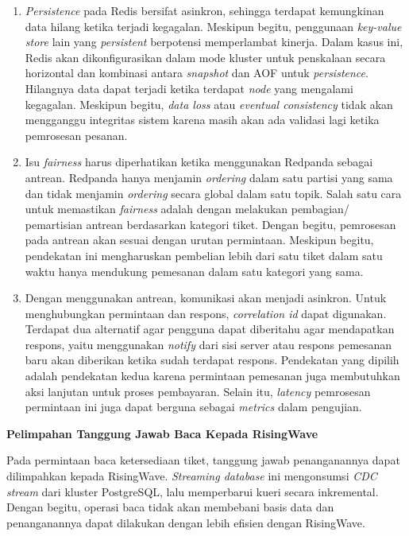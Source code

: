 \begin{enumerate}
    \item \textit{Persistence} pada Redis bersifat asinkron, sehingga terdapat kemungkinan data hilang ketika terjadi kegagalan. Meskipun begitu, penggunaan \textit{key-value store} lain yang \textit{persistent} berpotensi memperlambat kinerja. Dalam kasus ini, Redis akan dikonfigurasikan dalam mode kluster untuk penskalaan secara horizontal dan kombinasi antara \textit{snapshot} dan AOF untuk \textit{persistence}. Hilangnya data dapat terjadi ketika terdapat \textit{node} yang mengalami kegagalan. Meskipun begitu, \textit{data loss} atau \textit{eventual consistency} tidak akan mengganggu integritas sistem karena masih akan ada validasi lagi ketika pemrosesan pesanan.
    \item Isu \textit{fairness} harus diperhatikan ketika menggunakan Redpanda sebagai antrean. Redpanda hanya menjamin \textit{ordering} dalam satu partisi yang sama dan tidak menjamin \textit{ordering} secara global dalam satu topik. Salah satu cara untuk memastikan \textit{fairness} adalah dengan melakukan pembagian/ pemartisian antrean berdasarkan kategori tiket. Dengan begitu, pemrosesan pada antrean akan sesuai dengan urutan permintaan. Meskipun begitu, pendekatan ini mengharuskan pembelian lebih dari satu tiket dalam satu waktu hanya mendukung pemesanan dalam satu kategori yang sama.
    \item Dengan menggunakan antrean, komunikasi akan menjadi asinkron. Untuk menghubungkan permintaan dan respons, \textit{correlation id} dapat digunakan. Terdapat dua alternatif agar pengguna dapat diberitahu agar mendapatkan respons, yaitu menggunakan \textit{notify} dari sisi server atau respons pemesanan baru akan diberikan ketika sudah terdapat respons. Pendekatan yang dipilih adalah pendekatan kedua karena permintaan pemesanan juga membutuhkan aksi lanjutan untuk proses pembayaran. Selain itu, \textit{latency} pemrosesan permintaan ini juga dapat berguna sebagai \textit{metrics} dalam pengujian.
\end{enumerate}

\textbf{Pelimpahan Tanggung Jawab Baca Kepada RisingWave}

Pada permintaan baca ketersediaan tiket, tanggung jawab penanganannya dapat dilimpahkan kepada RisingWave. \textit{Streaming database} ini mengonsumsi \textit{CDC stream} dari kluster PostgreSQL, lalu memperbarui kueri secara inkremental. Dengan begitu, operasi baca tidak akan membebani basis data dan penanganannya dapat dilakukan dengan lebih efisien dengan RisingWave.

